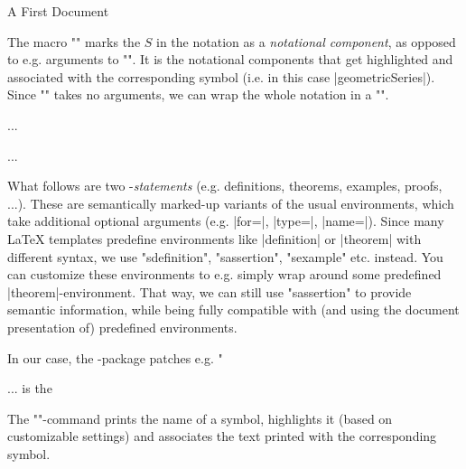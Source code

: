\begin{sfragment}{A First \sTeX Document}
    \begin{function}{\comp}
      The macro \stexcode"\comp" marks the $S$ in the notation as a
      \emph{notational component}, as opposed to e.g. arguments
      to \stexcode"\geometricSeries".
      It is the notational components that get highlighted
      and associated with the corresponding symbol (i.e. in this
      case |geometricSeries|). Since \stexcode"\geometricSeries" takes
      no arguments, we can wrap the whole notation in a \stexcode"\comp".
    \end{function}\bigskip

    \begin{latexcode}[numbers=none,aboveskip=0pt,belowskip=0pt,gobble=8]
        \begin{sdefinition}[for=geometricSeries]
        ...
        \end{sdefinition}
        \begin{sassertion}[name=geometricSeriesConverges,type=theorem]
        ...
        \end{sassertion}
    \end{latexcode}
    What follows are two \sTeX-\emph{statements} (e.g. definitions,
    theorems, examples, proofs, ...). These are semantically marked-up
    variants of the usual environments, which take additional optional
    arguments (e.g. |for=|, |type=|, |name=|). Since many \LaTeX\xspace templates
    predefine environments like |definition| or |theorem| with
    different syntax, we use \stexcode"sdefinition", 
    \stexcode"sassertion", \stexcode"sexample"
    etc. instead. You can customize these environments to e.g.
    simply wrap around some predefined |theorem|-environment.
    That way, we can still use \stexcode"sassertion" to provide semantic
    information, while being fully compatible with (and using
    the document presentation of) predefined environments.

    In our case, the -package patches
    e.g. \stexcode"\fi

    \begin{latexcode}[numbers=none,aboveskip=0pt,belowskip=0pt,gobble=6]
      ... is the 
    \end{latexcode}
    \begin{function}{\symname}
      The \stexcode"\symname"-command prints the name of a symbol,
      highlights it (based on customizable settings)
      and associates the text printed with the corresponding
      symbol.
      

\end{function}
\end{sfragment}
